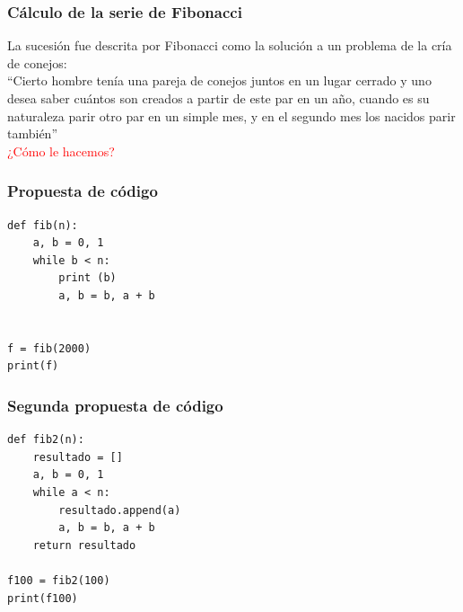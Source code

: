 \begin{frame}
\frametitle{Cálculo de la serie de Fibonacci}
La sucesión fue descrita por Fibonacci como la solución a un problema de la cría de conejos: 
\\
\bigskip
\enquote{Cierto hombre tenía una pareja de conejos juntos en un lugar cerrado y uno desea saber cuántos son creados a partir de este par en un año, cuando es su naturaleza parir otro par en un simple mes, y en el segundo mes los nacidos parir también}
\\
\bigskip
\pause
\textcolor{red}{¿Cómo le hacemos?}
\end{frame}
\begin{frame}[fragile]
\frametitle{Propuesta de código}
\begin{lstlisting}[caption=Primer intento para la serie de Fibonacci, basicstyle=\linespread{1.2}\ttfamily\small, columns=fullflexible,escapeinside=||]
def fib(n):
    a, b = 0, 1
    while b < n:
        print (b)
        a, b = b, a + b


f = fib(2000)
print(f)
\end{lstlisting}
\pause
\end{frame}
\begin{frame}[fragile]
\frametitle{Segunda propuesta de código}
\begin{lstlisting}[caption=Otra propuesta para la serie de Fibonacci, basicstyle=\linespread{1.2}\ttfamily\small, columns=fullflexible,escapeinside=||]
def fib2(n):
	resultado = []
    a, b = 0, 1
    while a < n:
        resultado.append(a)
        a, b = b, a + b
    return resultado

f100 = fib2(100)
print(f100)
\end{lstlisting}

\end{frame}
